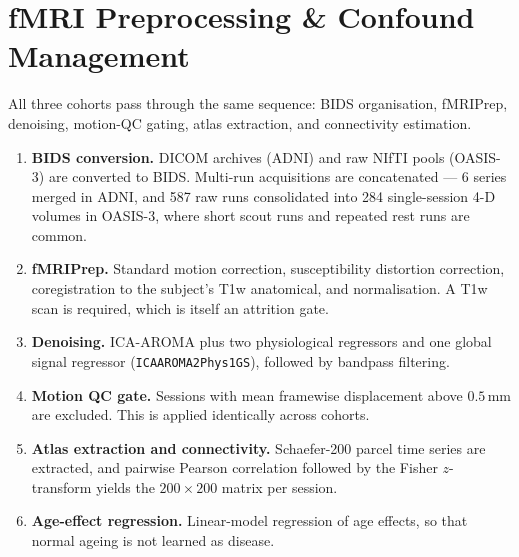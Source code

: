 
\section{fMRI Preprocessing \& Confound Management}
\label{sec:preprocessing}

All three cohorts pass through the same sequence: BIDS organisation, fMRIPrep, denoising,
motion-QC gating, atlas extraction, and connectivity estimation.

\begin{enumerate}
  \item \textbf{BIDS conversion.} DICOM archives (ADNI) and raw NIfTI pools (OASIS-3) are
    converted to BIDS. Multi-run acquisitions are concatenated --- 6 series merged in ADNI,
    and 587 raw runs consolidated into 284 single-session 4-D volumes in OASIS-3, where
    short scout runs and repeated rest runs are common.
  \item \textbf{fMRIPrep.} Standard motion correction, susceptibility distortion
    correction, coregistration to the subject's T1w anatomical, and normalisation. A T1w
    scan is required, which is itself an attrition gate.
  \item \textbf{Denoising.} ICA-AROMA plus two physiological regressors and one global
    signal regressor (\texttt{ICAAROMA2Phys1GS}), followed by bandpass filtering.
  \item \textbf{Motion QC gate.} Sessions with mean framewise displacement above
    $0.5$\,mm are excluded. This is applied identically across cohorts.
  \item \textbf{Atlas extraction and connectivity.} Schaefer-200 parcel time series are
    extracted, and pairwise Pearson correlation followed by the Fisher $z$-transform yields
    the $200 \times 200$ matrix per session.
  \item \textbf{Age-effect regression.} Linear-model regression of age effects, so that
    normal ageing is not learned as disease.
\end{enumerate}

